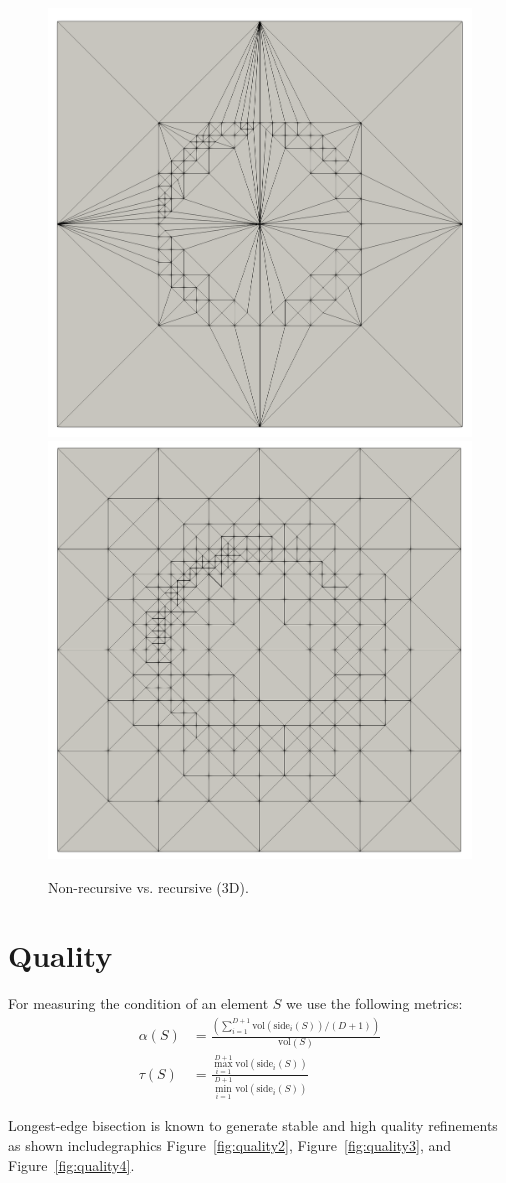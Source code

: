 \documentclass{article}
\begin{document}
\begin{figure} \centering \footnotesize
	\includegraphics[width=0.45\linewidth]{figures/non-recursive} \hfill
	\includegraphics[width=0.45\linewidth]{figures/recursive}
	\caption{Non-recursive vs. recursive (3D).}
	\label{fig:recur}
\end{figure}



\section{Quality}

For measuring the condition of an element $S$ we use the following metrics:
\begin{align*}
	\alpha(S) &= \frac{\left( \sum_{i=1}^{D+1} \text{vol}(\text{side}_i(S))/(D+1)  \right)}{\text{vol}(S)} \\
	\tau(S) &= \frac{\max_{i=1}^{D+1} \text{vol}(\text{side}_i(S))}{\min_{i=1}^{D+1} \text{vol}(\text{side}_i(S))}
\end{align*}


Longest-edge bisection is known to generate stable and high quality refinements as shown includegraphics Figure~\ref{fig:quality2}, Figure~\ref{fig:quality3}, and Figure~\ref{fig:quality4}. 

\end{document}
